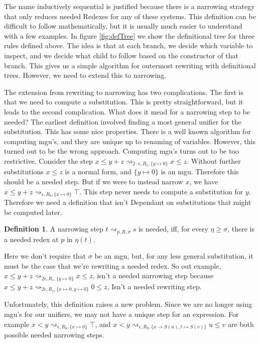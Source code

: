\documentclass{article}
\theoremstyle{definition}
\newtheorem{definition}{Definition}[section]
\begin{document}
The name inductively sequential is justified because there is a narrowing strategy that only reduces needed Redexes for any
of these systems.
This definition can be difficult to follow mathematically, but it is usually much easier to understand with a few examples.
In figure \ref{fig:defTree} we show the definitional tree for three rules defined above.
The idea is that at each branch, we decide which variable to inspect,
and we decide what child to follow based on the constructor of that branch.
This gives us a simple algorithm for outermost rewriting with definitional trees.
However, we need to extend this to narrowing.

The extension from rewriting to narrowing has two complications.
The first is that we need to compute a substitution.  This is pretty straightforward,
but it leads to the second complication.
What does it mead for a narrowing step to be needed?
The earliest definition involved finding a most general unifier for the substitution.
This has some nice properties.
There is a well known algorithm for computing mgu's, and they are unique up to renaming of variables.
However, this turned out to be the wrong approach.
Computing mgu's turns out to be too restrictive.
Consider the step $x \le y + z \rightsquigarrow_{2\cdot \epsilon,R_1,\{y \mapsto 0\}} x \le z$.  
Without further substitutions $x \le z$ is a normal form, and $\{y \mapsto 0\}$ is an mgu.
Therefore this should be a needed step.
But if we were to instead narrow $x$, we have $x \le y + z \rightsquigarrow_{\epsilon,R_8,\{x \mapsto 0\}} \top$.
This step never needs to compute a substitution for $y$.
Therefore we need a definition that isn't Dependant on substitutions that might be computed later.


\theoremstyle{definition}
\begin{definition}
    A narrowing step $t \rightsquigarrow_{p, R, \sigma} s$ is needed, iff, for every $\eta \ge \sigma$,
    there is a needed redex at $p$ in $\eta(t)$.
\end{definition}

Here we don't require that $\sigma$ be an mgu, but, for any less general substitution,
it must be the case that we're rewriting a needed redex.
So out example, $x \le y + z \rightsquigarrow_{2\dot \epsilon,R_1,\{y \mapsto 0\}} x \le z$,
isn't a needed narrowing step because $x \le y + z \rightsquigarrow_{2\dot \epsilon,R_1,\{x \mapsto 0, y \mapsto 0\}} 0 \le z$,
Isn't a needed rewriting step.

Unfortunately, this definition raises a new problem.
Since we are no longer using mgu's for our unifiers, we may not have a unique step for an expression.
For example $x < y \rightsquigarrow_{\epsilon, R_8, \{x\mapsto 0\}} \top $, and
$x < y \rightsquigarrow_{\epsilon, R_9, \{x\rightarrow S(u), t \mapsto S(v)\}} u \le v $
are both possible needed narrowing steps.
\end{document}
